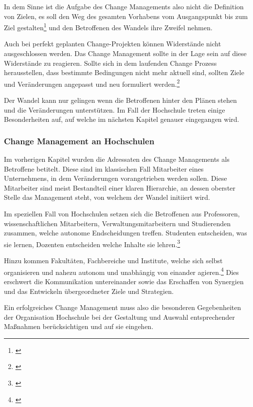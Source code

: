 In dem Sinne ist die Aufgabe des Change Managements also nicht die Definition von Zielen, es soll den Weg des gesamten Vorhabens vom Ausgangspunkt bis zum Ziel gestalten\footnote{\cite{lauer_change_2014}} und den Betroffenen des Wandels ihre Zweifel nehmen.

Auch bei perfekt geplanten Change-Projekten können Widerstände nicht ausgeschlossen werden. Das Change Management sollte in der Lage sein auf diese Widerstände zu reagieren. Sollte sich in dem laufenden Change Prozess herausstellen, dass bestimmte Bedingungen nicht mehr aktuell sind, sollten Ziele und Veränderungen angepasst und neu formuliert werden.\footnote{\cite{fisch_veraenderungen_2008}}

Der Wandel kann nur gelingen wenn die Betroffenen hinter den Plänen stehen und die Veränderungen unterstützen. Im Fall der Hochschule treten einige Besonderheiten auf, auf welche im nächsten Kapitel genauer eingegangen wird.

\subsubsection{Change Management an Hochschulen}
\label{subsubsection_change_management_an_HS}
Im vorherigen Kapitel wurden die Adressaten des Change Managements als Betroffene betitelt. Diese sind im klassischen Fall Mitarbeiter eines Unternehmens, in dem Veränderungen vorangetrieben werden sollen. Diese Mitarbeiter sind  meist Bestandteil einer klaren Hierarchie, an dessen oberster Stelle das Management steht, von welchem der Wandel initiiert wird. 

Im speziellen Fall von Hochschulen setzen sich die Betroffenen aus Professoren, wissenschaftlichen Mitarbeitern, Verwaltungsmitarbeitern und Studierenden zusammen, welche autonome Endscheidungen treffen. Studenten entscheiden, was sie lernen, Dozenten entscheiden welche Inhalte sie lehren.\footnote{\cite{hoelscher_wissenschaft_2011}}

Hinzu kommen Fakultäten, Fachbereiche und Institute, welche sich selbst organisieren und nahezu autonom und unabhängig von einander agieren.\footnote{\cite{fisch_veraenderungen_2008}} 
Dies erschwert die Kommunikation untereinander sowie das Erschaffen von Synergien und das Entwickeln übergeordneter Ziele und Strategien.

Ein erfolgreiches Change Management muss also die besonderen Gegebenheiten der Organisation Hochschule bei der Gestaltung und Auswahl entsprechender Maßnahmen berücksichtigen und auf sie eingehen.

